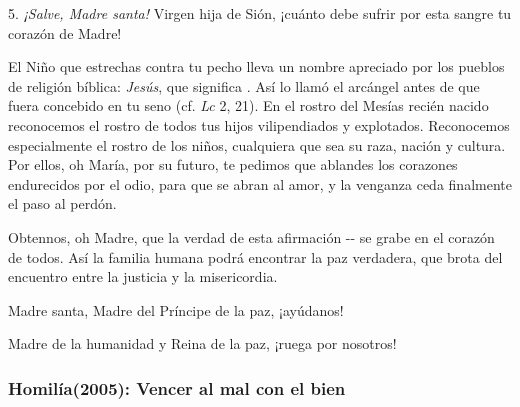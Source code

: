 \begin{body}
	5. \emph{¡Salve, Madre santa!} Virgen hija de Sión, ¡cuánto debe sufrir por esta sangre tu corazón de Madre!
	
	El Niño que estrechas contra tu pecho lleva un nombre apreciado por los pueblos de religión bíblica: \emph{Jesús}, que significa . Así lo llamó el arcángel antes de que fuera concebido en tu seno (cf. \emph{Lc} 2, 21). En el rostro del Mesías recién nacido reconocemos el rostro de todos tus hijos vilipendiados y explotados. Reconocemos especialmente el rostro de los niños, cualquiera que sea su raza, nación y cultura. Por ellos, oh María, por su futuro, te pedimos que ablandes los corazones endurecidos por el odio, para que se abran al amor, y la venganza ceda finalmente el paso al perdón.
	
	Obtennos, oh Madre, que la verdad de esta afirmación -- se grabe en el corazón de todos. Así la familia humana podrá encontrar la paz verdadera, que brota del encuentro entre la justicia y la misericordia.
	
	Madre santa, Madre del Príncipe de la paz, ¡ayúdanos!
	
	Madre de la humanidad y Reina de la paz, ¡ruega por nosotros!
\end{body}

\subsubsection{Homilía(2005): Vencer al mal con el bien}



